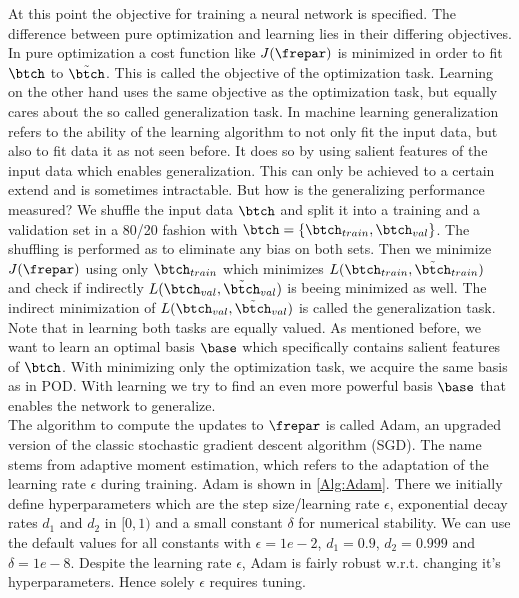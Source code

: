 At this point the objective for training a neural network is specified. The difference between pure optimization and learning lies in their differing objectives. In pure optimization a cost function like \(J(\frepar)\) is minimized in order to fit \(\btch\) to \(\tilde{\btch}\). This is called the objective of the optimization task. Learning on the other hand uses the same objective as the optimization task, but equally cares about the so called generalization task. In machine learning generalization refers to the ability of the learning algorithm to not only fit the input data, but also to fit data it as not seen before. It does so by using salient features of the input data which enables generalization. This can only be achieved to a certain extend and is sometimes intractable. But how is the generalizing performance measured? We shuffle the input data \(\btch\) and split it into a training and a validation set in a 80/20 fashion with \(\btch=\{\btch_{train},\btch_{val}\}\). The shuffling is performed as to eliminate any bias on both sets. Then we minimize \(J(\frepar)\) using only \(\btch_{train}\) which minimizes \(L(\btch_{train},\tilde{\btch}_{train})\) and check if indirectly \(L(\btch_{val},\tilde{\btch}_{val})\) is beeing minimized as well. The indirect minimization of \(L(\btch_{val},\tilde{\btch}_{val})\) is called the generalization task. Note that in learning both tasks are equally valued. As mentioned before, we want to learn an optimal basis \(\base\) which specifically contains salient features of \(\btch\). With minimizing only the optimization task, we acquire the same basis as in POD. With learning we try to find an even more powerful basis \(\base\) that enables the network to generalize.\\  
The algorithm to compute the updates to \(\frepar\) is called Adam, an upgraded version of the classic stochastic gradient descent algorithm (SGD). The name stems from adaptive moment estimation, which refers to the adaptation of the learning rate \(\epsilon\) during training. Adam is shown in \cref{Alg:Adam}. There we initially define hyperparameters which are the step size/learning rate \(\epsilon\), exponential decay rates \(d_1\) and \(d_2\) in \([0,1)\) and a small constant \(\delta\) for numerical stability. We can use the default values for all constants with \(\epsilon=1e-2\), \(d_1=0.9\), \(d_2=0.999\) and \(\delta=1e-8\).  Despite the learning rate \(\epsilon\), Adam is fairly robust w.r.t. changing it's hyperparameters. Hence solely \(\epsilon\) requires tuning.
